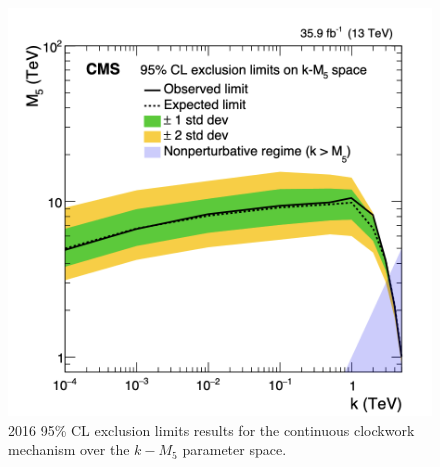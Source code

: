 \begin{table}[pt]
	\centering
	\caption{Previous exclusion limits results on the mass scale \Ms in {\TeVns} for various conventions used in the calculation of the ADD large extra-dimensional scenario using the 2016 CMS detector data corresponding to an integrated luminosity of 35.9 \fbinv~\cite{CMS:2018dqv} only. }
	\label{tab:ADD_limits2016}
\end{table}


\begin{figure}[ht]
    \centering
    \includegraphics[scale=0.5]{fig/ClockworkCMS.png}
    \caption{2016 95\%  CL exclusion limits results for the continuous clockwork mechanism over the $k -M_5$ parameter space.}
    \label{fig:ClockworkCMS2016}
\end{figure}


